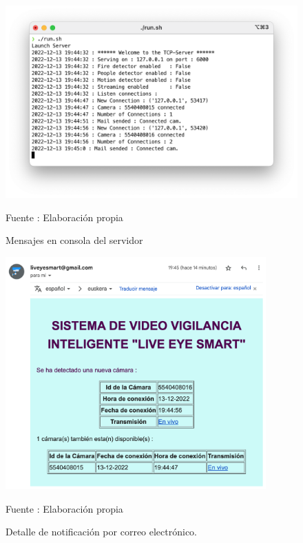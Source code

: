 \begin{figure}[H]
    \begin{center}
        \includegraphics[width=15cm]{img/capitulo_6/server_cam_connected_more_cams.png}
    \end{center}
    \begin{center}
        \caption{Mensajes en consola del servidor}
        Fuente : Elaboración propia
    \end{center}
\end{figure}

\begin{figure}[H]
    \begin{center}
        \includegraphics[width=10cm]{img/capitulo_6/mail2.png}
    \end{center}
    \begin{center}
        \caption{Detalle de notificación por correo electrónico.}
        Fuente : Elaboración propia
    \end{center}
\end{figure}


